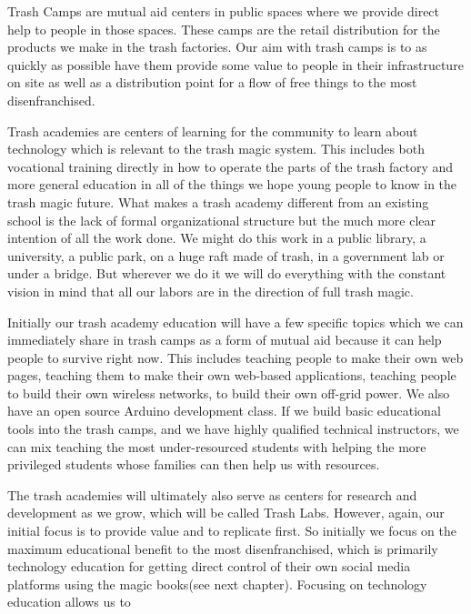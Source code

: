 \documentclass{report}
\begin{document}
Trash Camps are mutual aid centers in public spaces where we provide direct help to people in those spaces.  These camps are the retail distribution for the products we make in the trash factories.  Our aim with trash camps is to as quickly as possible have them provide some value to people in their infrastructure on site as well as a distribution point for a flow of free things to the most disenfranchised.

Trash academies are centers of learning for the community to learn about technology which is relevant to the trash magic system.  This includes both vocational training directly in how to operate the parts of the trash factory and more general education in all of the things we hope young people to know in the trash magic future.  What makes a trash academy different from an existing school is the lack of formal organizational structure but the much more clear intention of all the work done.  We might do this work in a public library, a university, a public park, on a huge raft made of trash, in a government lab or under a bridge. But wherever we do it we will do everything with the constant vision in mind that all our labors are in the direction of full trash magic.

Initially our trash academy education will have a few specific topics which we can immediately share in trash camps as a form of mutual aid because it can help people to survive right now.  This includes teaching people to make their own web pages, teaching them to make their own web-based applications, teaching people to build their own wireless networks, to build their own off-grid power.  We also have an open source Arduino development class.  If we build basic educational tools into the trash camps, and we have highly qualified technical instructors, we can mix teaching the most under-resourced students with helping the more privileged students whose families can then help us with resources.  

The trash academies will ultimately also serve as centers for research and development as we grow, which will be called Trash Labs.  However, again, our initial focus is to provide value and to replicate first.  So initially we focus on the maximum educational benefit to the most disenfranchised, which is primarily technology education for getting direct control of their own social media platforms using the magic books(see next chapter).  Focusing on technology education allows us to 
\end{document}
